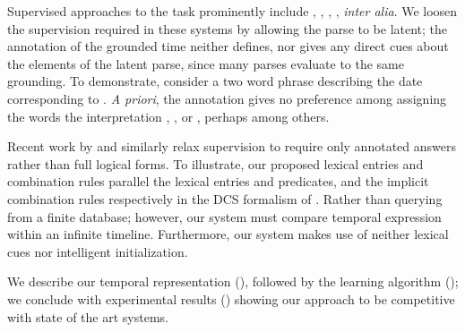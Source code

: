 Supervised approaches to the task prominently include
	,
	,
	, 
	, 
	\textit{inter alia}.
We loosen the supervision required in these systems by allowing the parse to
	be latent;
	the annotation of the grounded time neither defines, nor gives any
	direct cues about the elements of the latent parse, since many parses evaluate
	to the same grounding.
To demonstrate, consider a two word phrase describing the date corresponding to
	.
\textit{A priori}, the annotation gives no preference among assigning the
	words the interpretation , ,
	or \te{[month] [day]}, perhaps among others.

Recent work by  and 
	 similarly relax supervision 
	to require only annotated answers rather than full logical forms.
To illustrate, our proposed lexical entries and combination rules parallel
	the lexical entries and predicates, and the implicit combination rules
	respectively in the DCS formalism of .
Rather than querying from a finite database; however, our system must compare
	temporal expression within an infinite timeline.
Furthermore, our system makes use of neither lexical cues nor intelligent
	initialization.

We describe our temporal representation
	(), followed by the learning algorithm
	(); we conclude with experimental results 
	() showing our
	approach to be competitive with state of the art systems.
